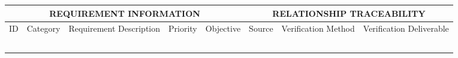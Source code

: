 \documentclass[fleqn,10pt]{project}
\begin{document}
\begin{landscape}
\begin{table}[!h]
\begin{tabular}{|cccccccc|}
\multicolumn{5}{|c|}{REQUIREMENT INFORMATION}                                                                                                                                                                                                                          & \multicolumn{3}{c|}{RELATIONSHIP TRACEABILITY}                                                                     \\ \hline
\multicolumn{1}{|c|}{ID}                                                                              & \multicolumn{1}{c|}{Category} & \multicolumn{1}{c|}{Requirement Description} & \multicolumn{1}{c|}{Priority} & \multicolumn{1}{c|}{Objective}                  & \multicolumn{1}{c|}{Source}                  & \multicolumn{1}{c|}{Verification Method} & Verification Deliverable \\ \hline
\multicolumn{1}{|c|}{}                                                                                & \multicolumn{1}{c|}{}         & \multicolumn{1}{c|}{}                        & \multicolumn{1}{c|}{}         & \multicolumn{1}{c|}{}                           & \multicolumn{1}{c|}{}                        & \multicolumn{1}{c|}{}                    &                          \\ \hline
\multicolumn{1}{|c|}{}                                                                                & \multicolumn{1}{c|}{}         & \multicolumn{1}{c|}{}                        & \multicolumn{1}{c|}{}         & \multicolumn{1}{c|}{}                           & \multicolumn{1}{c|}{}                        & \multicolumn{1}{c|}{}                    &                          \\ \hline
\multicolumn{1}{|c|}{}                                                                                & \multicolumn{1}{c|}{}         & \multicolumn{1}{c|}{}                        & \multicolumn{1}{c|}{}         & \multicolumn{1}{c|}{}                           & \multicolumn{1}{c|}{}                        & \multicolumn{1}{c|}{}                    &                          \\ \hline
\multicolumn{1}{|c|}{}                                                                                & \multicolumn{1}{c|}{}         & \multicolumn{1}{c|}{}                        & \multicolumn{1}{c|}{}         & \multicolumn{1}{c|}{}                           & \multicolumn{1}{c|}{}                        & \multicolumn{1}{c|}{}                    &                          \\ \hline
\multicolumn{1}{|c|}{}                                                                                & \multicolumn{1}{c|}{}         & \multicolumn{1}{c|}{}                        & \multicolumn{1}{c|}{}         & \multicolumn{1}{c|}{}                           & \multicolumn{1}{c|}{}                        & \multicolumn{1}{c|}{}                    &                          \\ \hline

\end{tabular}
\end{table}
\end{landscape}
\end{document}
